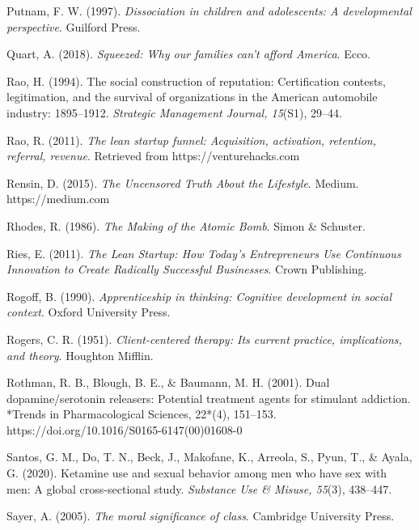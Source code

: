 \begin{thebibliography}{}
    Putnam, F. W. (1997). \textit{Dissociation in children and adolescents: A developmental perspective}. Guilford Press.


    Quart, A. (2018). \textit{Squeezed: Why our families can't afford America}. Ecco.


    Rao, H. (1994). The social construction of reputation: Certification contests, legitimation, and the survival of organizations in the American automobile industry: 1895–1912. \textit{Strategic Management Journal, 15}(S1), 29–44.

    Rao, R. (2011). \textit{The lean startup funnel: Acquisition, activation, retention, referral, revenue}. Retrieved from https://venturehacks.com

    Rensin, D. (2015). \textit{The Uncensored Truth About the Lifestyle}. Medium. https://medium.com

    Rhodes, R. (1986). \textit{The Making of the Atomic Bomb}. Simon \& Schuster.

    Ries, E. (2011). \textit{The Lean Startup: How Today’s Entrepreneurs Use Continuous Innovation to Create Radically Successful Businesses}. Crown Publishing.
    
    Rogoff, B. (1990). \textit{Apprenticeship in thinking: Cognitive development in social context}. Oxford University Press.

    Rogers, C. R. (1951). \textit{Client-centered therapy: Its current practice, implications, and theory}. Houghton Mifflin.

    Rothman, R. B., Blough, B. E., \& Baumann, M. H. (2001). Dual dopamine/serotonin releasers: Potential treatment agents for stimulant addiction. *Trends in Pharmacological Sciences, 22*(4), 151–153. https://doi.org/10.1016/S0165-6147(00)01608-0


    Santos, G. M., Do, T. N., Beck, J., Makofane, K., Arreola, S., Pyun, T., \& Ayala, G. (2020). Ketamine use and sexual behavior among men who have sex with men: A global cross-sectional study. \textit{Substance Use \& Misuse, 55}(3), 438–447.

    Sayer, A. (2005). \textit{The moral significance of class}. Cambridge University Press.


\end{thebibliography}
